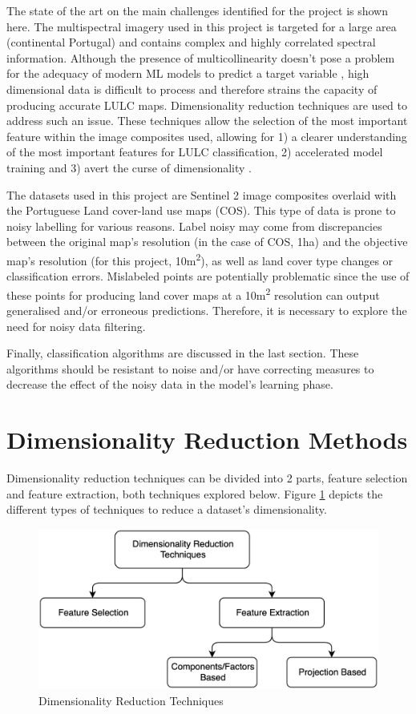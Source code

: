 \documentclass[12pt, english, openany]{book}
\begin{document}
The state of the art on the main challenges identified for the project is shown
here. The multispectral imagery used in this project is targeted for a large
area (continental Portugal) and contains complex and highly correlated spectral
information. Although the presence of multicollinearity doesn't pose a problem
for the adequacy of modern ML models to predict a target variable
\cite{Farrell2019}, high dimensional data is difficult to process and
therefore strains the capacity of producing accurate LULC maps. Dimensionality
reduction techniques are used to address such an issue. These techniques allow
the selection of the most important feature within the image composites used,
allowing for 1) a clearer understanding of the most important features for LULC
classification, 2) accelerated model training and 3) avert the curse of
dimensionality \cite{Ghojogh2019}.

The datasets used in this project are Sentinel 2 image composites overlaid with
the Portuguese Land cover-land use maps (COS). This type of data is prone to
noisy labelling for various reasons. Label noisy may come from discrepancies
between the original map's resolution (in the case of COS, 1ha) and the
objective map's resolution (for this project, 10m\textsuperscript{2}), as
well as land cover type changes or classification errors. Mislabeled points are
potentially problematic since the use of these%
points for producing land cover maps at a 10m\textsuperscript{2} resolution
can output generalised and/or erroneous predictions. Therefore, it is necessary
to explore the need for noisy data filtering.

Finally, classification algorithms are discussed in the last section. These
algorithms should be resistant to noise and/or have correcting measures to
decrease the effect of the noisy data in the model's learning phase.

\section{Dimensionality Reduction Methods} \label{sec:dimensionality-reduction-LR}
Dimensionality reduction techniques can be divided into 2 parts, feature
selection and feature extraction, both techniques explored below. Figure
\ref{fig:dimensionality-reduction} depicts the different types of techniques to reduce a
dataset's dimensionality.

\begin{figure}[H]
  \centering
  \includegraphics[width=.8\linewidth]{dimensionality_reduction.png}
  \caption{Dimensionality Reduction Techniques}
  \label{fig:dimensionality-reduction}
\end{figure}
\end{document}
